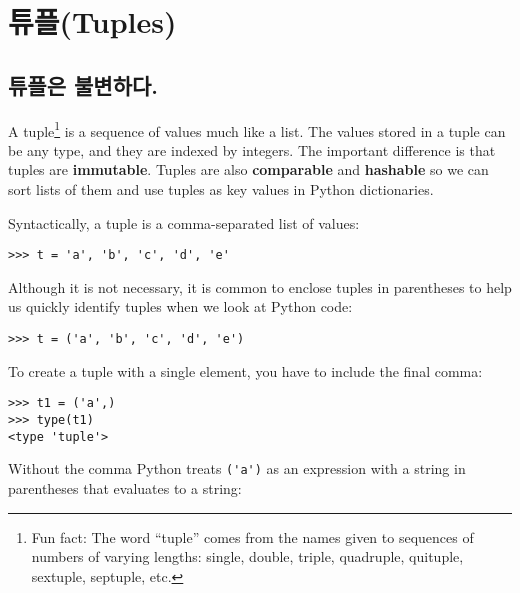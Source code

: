 
\chapter{튜플(Tuples)}
\label{tuplechap}

\section{튜플은 불변하다.}


A tuple\footnote{Fun fact: The word ``tuple'' comes from the names
given to sequences of numbers of varying lengths: single, 
double, triple, quadruple, quituple, sextuple, septuple, etc.}
is a sequence of values much like a list.  
The values stored in a tuple can be any type, and
they are indexed by integers.
The important difference is that tuples are {\bf immutable}.
Tuples are also {\bf comparable} and {\bf hashable} so we can 
sort lists of them and use tuples as key values in Python
dictionaries.


Syntactically, a tuple is a comma-separated list of values:

\beforeverb
\begin{verbatim}
>>> t = 'a', 'b', 'c', 'd', 'e'
\end{verbatim}
\afterverb
%
Although it is not necessary, it is common to enclose tuples in
parentheses to help us quickly identify tuples when we look at
Python code:


\beforeverb
\begin{verbatim}
>>> t = ('a', 'b', 'c', 'd', 'e')
\end{verbatim}
\afterverb
%
To create a tuple with a single element, you have to include the final
comma:


\beforeverb
\begin{verbatim}
>>> t1 = ('a',)
>>> type(t1)
<type 'tuple'>
\end{verbatim}
\afterverb
%
Without the comma Python treats \verb"('a')" as an expression 
with a string in parentheses that evaluates to a string:

